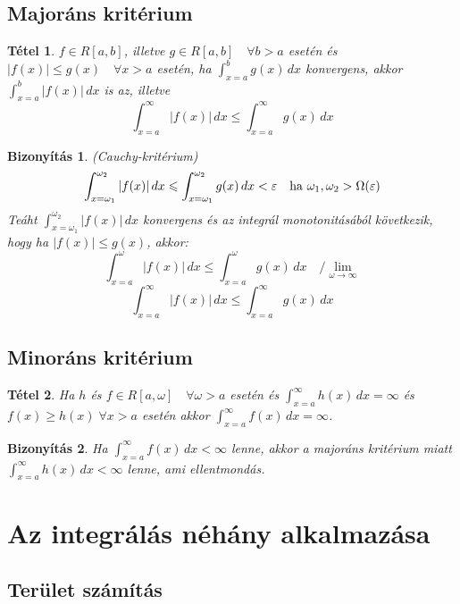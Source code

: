 \documentclass[a4paper,12pt,twoside]{book}
\newtheorem{tetel}{Tétel}[chapter]
\theoremstyle{break}
\newtheorem{biz}{Bizonyítás}[chapter]
\theoremstyle{plain}
\newtheorem{bizNoNL}[biz]{Bizonyítás}
\newcommand{\hatInteg}[3]{\ensuremath{\int^{#2}_{x=#1} #3\, dx}}
\begin{document}
\subsection{Majoráns kritérium}

\begin{tetel}
 $f\in R[a,b]$, illetve $g\in R[a,b] \quad \forall b> a$ esetén és $|f(x)|\leqslant g(x) \quad \forall x>a$ esetén, ha $\displaystyle \hatInteg{a}{b}{g(x)}$ konvergens, akkor $\displaystyle \hatInteg{a}{b}{|f(x)|}$ is az, illetve
 \[\displaystyle \hatInteg{a}{\infty}{|f(x)|} \leqslant \hatInteg{a}{\infty}{g(x)}\]
\end{tetel}
\begin{bizNoNL} (Cauchy-kritérium)\\
 \[\hatInteg{\omega_1}{\omega_2}{|f(x)|} \leqslant \hatInteg{\omega_1}{\omega_2}{g(x)} < \varepsilon \quad \hbox{ha } \omega_1, \omega_2 > \Omega(\varepsilon)\]
 Teáht $\displaystyle\hatInteg{\omega_1}{\omega_2}{|f(x)|}$ konvergens és az integrál monotonitásából következik, hogy ha $|f(x)|\leqslant g(x)$, akkor:
  \[\hatInteg{a}{\omega}{|f(x)|} \leqslant \hatInteg{a}{\omega}{g(x)} \quad / \lim_{\omega\to\infty}\]
  \[\hatInteg{a}{\infty}{|f(x)|} \leqslant \hatInteg{a}{\infty}{g(x)}\]
\end{bizNoNL}

\subsection{Minoráns kritérium}

\begin{tetel}
 Ha $h$ és $f\in R[a,\omega] \quad \forall \omega > a$ esetén és $\displaystyle \hatInteg{a}{\infty}{h(x)} = \infty$ és $f(x) \geqslant h(x) \;\forall x>a$ esetén akkor $\displaystyle \hatInteg{a}{\infty}{f(x)} = \infty$.
\end{tetel}
\begin{biz}
 Ha $\displaystyle \hatInteg{a}{\infty}{f(x)} < \infty$ lenne, akkor a majoráns kritérium miatt $\hatInteg{a}{\infty}{h(x)} < \infty$ lenne, ami ellentmondás.
\end{biz}

\section{Az integrálás néhány alkalmazása}

\subsection{Terület számítás}
\end{document}
